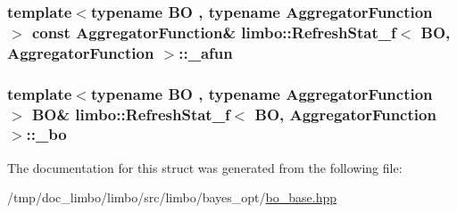 \subsubsection[{\+\_\+afun}]{\setlength{\rightskip}{0pt plus 5cm}template$<$typename B\+O , typename Aggregator\+Function $>$ const Aggregator\+Function\& {\bf limbo\+::\+Refresh\+Stat\+\_\+f}$<$ B\+O, Aggregator\+Function $>$\+::\+\_\+afun}\label{structlimbo_1_1_refresh_stat__f_af02fdc84a4066c199d26e823b9887531}
\hypertarget{structlimbo_1_1_refresh_stat__f_ad94ccf3c46dbed8e9f8ab573af8fb258}{}
\subsubsection[{\+\_\+bo}]{\setlength{\rightskip}{0pt plus 5cm}template$<$typename B\+O , typename Aggregator\+Function $>$ B\+O\& {\bf limbo\+::\+Refresh\+Stat\+\_\+f}$<$ B\+O, Aggregator\+Function $>$\+::\+\_\+bo}\label{structlimbo_1_1_refresh_stat__f_ad94ccf3c46dbed8e9f8ab573af8fb258}


The documentation for this struct was generated from the following file\+:\begin{DoxyCompactItemize}
\item 
/tmp/doc\+\_\+limbo/limbo/src/limbo/bayes\+\_\+opt/\hyperlink{bo__base_8hpp}{bo\+\_\+base.\+hpp}\end{DoxyCompactItemize}
